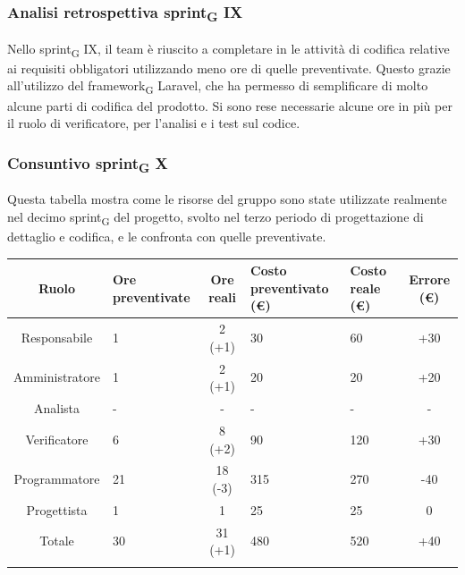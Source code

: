 \subsubsection{Analisi retrospettiva sprint\textsubscript{G} IX}

Nello sprint\textsubscript{G} IX, il team è riuscito a completare in le attività di codifica relative ai requisiti obbligatori utilizzando meno ore di quelle preventivate. Questo grazie all'utilizzo del framework\textsubscript{G} Laravel, che ha permesso di semplificare di molto alcune parti di codifica del prodotto.
Si sono rese necessarie alcune ore in più per il ruolo di verificatore, per l'analisi e i test sul codice.

\newpage
\subsubsection{Consuntivo sprint\textsubscript{G} X}

Questa tabella mostra come le risorse del gruppo sono state utilizzate realmente nel decimo sprint\textsubscript{G} del progetto, svolto nel terzo periodo di progettazione di dettaglio e codifica, e le confronta con quelle preventivate.

\setlength\extrarowheight{5pt}
\begin{tabularx}{\textwidth}{|c|XcXX|c|}
	\hline
	\rowcolor{white}
	\textbf{Ruolo} & \textbf{Ore preventivate} & \textbf{Ore reali} & \textbf{Costo preventivato (€)} & \textbf{Costo reale (€)} & \textbf{Errore (€)} \\
	\hline
	Responsabile & 1 & 2 (+1) & 30 & 60 & +30 \\
	Amministratore & 1 & 2 (+1) & 20 & 20 & +20 \\
	Analista & - & - & - & - & - \\
	Verificatore & 6 & 8 (+2) & 90 & 120 & +30 \\
	Programmatore & 21 & 18 (-3) & 315 & 270 & -40 \\
	Progettista & 1 & 1 & 25 & 25 & 0 \\
	\hline
	Totale & 30 & 31 (+1) & 480 & 520 & +40 \\
	\hline
	\rowcolor{white}
	\caption{Consuntivo ore e costi per ruolo del decimo sprint\textsubscript{G}}
\end{tabularx}

